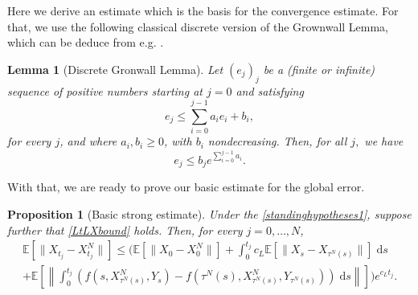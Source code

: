 \documentclass[reqno,12pt]{amsart}
\theoremstyle{plain} %
\newtheorem{lemma}{Lemma}[section]
\newtheorem{proposition}{Proposition}[section]
\theoremstyle{definition} %
\begin{document}
Here we derive an estimate which is the basis for the convergence estimate. For that, we use the following classical discrete version of the Grownwall Lemma, which can be deduce from e.g. \cite[Lemma 1]{Sugiyama1969}.

\begin{lemma}[Discrete Gronwall Lemma]
    \label{lemdiscretegronwall}
    Let $(e_j)_j$ be a (finite or infinite) sequence of positive numbers starting at $j=0$ and satisfying
    \begin{equation}
        \label{integralgronwall}
        e_j \leq \sum_{i=0}^{j-1} a_i e_i + b_i,
    \end{equation}
    for every $j$, and where $a_i, b_i \geq 0$, with $b_i$ nondecreasing. Then, for all $j,$ we have
    \begin{equation}
        \label{estimategronwall}
        e_j \leq b_j e^{\sum_{i=0}^{j-1} a_i}.
    \end{equation}
\end{lemma}

With that, we are ready to prove our basic estimate for the global error.
\begin{proposition}[Basic strong estimate]
    \label{propbasicstrongestimate}
    Under the \cref{standinghypotheses1}, suppose further that \cref{LtLXbound} holds. Then, for every $j = 0, \ldots, N$,
    \begin{multline}
        \label{expectedestimateglobalerrorintegral}
        \mathbb{E}\left[\|X_{t_j} - X_{t_j}^N\|\right] \leq \Bigg( \mathbb{E}\left[\|X_0 - X_0^N\|\right] + \int_0^{t_j} c_L \mathbb{E}\left[\|X_s - X_{\tau^N(s)}\|\right] \;\mathrm{d}s \\
        + \mathbb{E}\left[\left\|\int_0^{t_j} \left( f(s, X_{\tau^N(s)}^N, Y_s) - f(\tau^N(s), X_{\tau^N(s)}^N, Y_{\tau^N(s)}) \right)\;\mathrm{d}s\right\|\right]\Bigg) e^{c_L t_j}.
    \end{multline}
\end{proposition}
\end{document}
